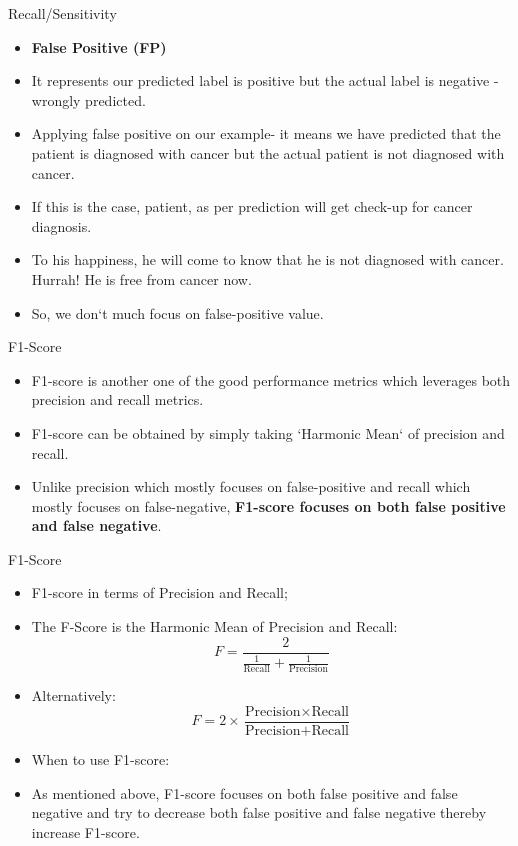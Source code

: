 \documentclass[11pt]{beamer}
\begin{document}
\begin{frame}{Recall/Sensitivity}
	\begin{itemize}
		\item \textbf{False Positive (FP)} 
		\item It represents our predicted label is positive but the actual label is negative - wrongly predicted. 
		\item Applying false positive on our example- it means we have predicted that the patient is diagnosed with cancer but the actual patient is not diagnosed with cancer. 
		\item If this is the case, patient, as per prediction will get check-up for cancer diagnosis. 
		\item To his happiness, he will come to know that he is not diagnosed with cancer. Hurrah! He is free from cancer now. 
		\item So, we don`t much focus on false-positive value.
	\end{itemize}
\end{frame}
\begin{frame}{F1-Score}
	\begin{itemize}
		\item F1-score is another one of the good performance metrics which leverages both precision and recall metrics. 
		\item F1-score can be obtained by simply taking `Harmonic Mean` of precision and recall. 
		\item Unlike precision which mostly focuses on false-positive and recall which mostly focuses on false-negative, \textbf{F1-score focuses on both false positive and false negative}.
	\end{itemize}
\end{frame}
\begin{frame}{F1-Score}
	\begin{itemize}
		\item F1-score in terms of Precision and Recall;
		\item The F-Score is the Harmonic Mean of Precision and Recall:$$F = \frac{2}{ \frac{1}{\text{Recall}} + \frac{1}{\text{Precision}}}$$
		\item  Alternatively:$$F = 2\times \frac{\text{Precision}\times \text{Recall}}{\text{Precision}+\text{Recall}}$$
		\item When to use F1-score:
		\item As mentioned above, F1-score focuses on both false positive and false negative and try to decrease both false positive and false negative thereby increase F1-score.
	\end{itemize}
\end{frame}
\end{document}
